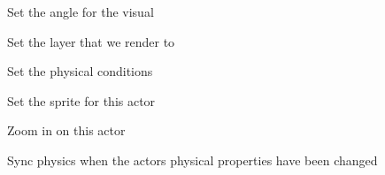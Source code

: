 \documentclass[letterpaper,10pt,english]{sphinxmanual}
\begin{document}
\begin{fulllineitems}
\begin{fulllineitems}
\end{fulllineitems}


\begin{fulllineitems}
\label{actor:serge.actor.Actor.setAngle}
Set the angle for the visual

\end{fulllineitems}


\begin{fulllineitems}
\label{actor:serge.actor.Actor.setLayerName}
Set the layer that we render to

\end{fulllineitems}


\begin{fulllineitems}
\label{actor:serge.actor.Actor.setPhysical}
Set the physical conditions

\end{fulllineitems}


\begin{fulllineitems}
\label{actor:serge.actor.Actor.setSpriteName}
Set the sprite for this actor

\end{fulllineitems}


\begin{fulllineitems}
\label{actor:serge.actor.Actor.setZoom}
Zoom in on this actor

\end{fulllineitems}


\begin{fulllineitems}
\label{actor:serge.actor.Actor.syncPhysics}
Sync physics when the actors physical properties have been changed


\end{fulllineitems}
\end{fulllineitems}
\end{document}
